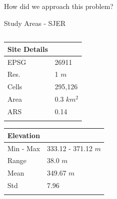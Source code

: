 \documentclass[
  ignorenonframetext,
]{beamer}
\begin{document}
\begin{frame}[fragile]{How did we approach this problem?}
\begin{block}{Study Areas - SJER}
\begin{columns}[T]
\begin{column}{0.5\textwidth}
\begin{longtable}[]{@{}ll@{}}
\toprule\noalign{}
Site Details & \\
\midrule\noalign{}
\endhead
EPSG & 26911 \\
Res. & 1 \(m\) \\
Cells & 295,126 \\
Area & 0.3 \(km^2\) \\
ARS & 0.14 \\
\bottomrule\noalign{}
\end{longtable}

\begin{longtable}[]{@{}ll@{}}
\toprule\noalign{}
Elevation & \\
\midrule\noalign{}
\endhead
Min - Max & 333.12 - 371.12 \(m\) \\
Range & 38.0 \(m\) \\
Mean & 349.67 \(m\) \\
Std & 7.96 \\
\bottomrule\noalign{}
\end{longtable}
\end{column}
\end{columns}
\end{block}


\end{frame}
\end{document}
